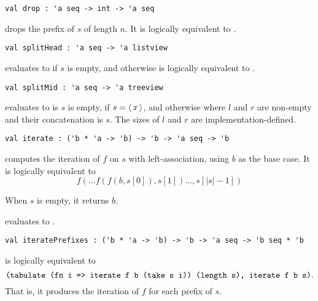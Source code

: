 \begin{gram}[drop]
\label{gr:drop}
\begin{verbatim}
val drop : 'a seq -> int -> 'a seq
\end{verbatim}
 drops the prefix of $s$ of length $n$. It is logically equivalent
to .
\end{gram}

\begin{gram}[splitHead]
\label{gr:splitHead}
\begin{verbatim}
val splitHead : 'a seq -> 'a listview
\end{verbatim}
 evaluates to  if $s$ is empty, and otherwise is
logically equivalent to .
\end{gram}

\begin{gram}[splitMid]
\label{gr:splitMid}
\begin{verbatim}
val splitMid : 'a seq -> 'a treeview
\end{verbatim}
 evaluates to  is $s$ is empty,  if
$s = \left\langle\, x \,\right\rangle$, and  otherwise where $l$ and $r$ are non-empty and their
concatenation is $s$. The sizes of $l$ and $r$ are implementation-defined.
\end{gram}

\begin{flex}
\begin{gram}[iterate]
\label{gr:iterate}
\begin{verbatim}
val iterate : ('b * 'a -> 'b) -> 'b -> 'a seq -> 'b
\end{verbatim}
 computes the iteration of $f$ on $s$ with left-association,
using $b$ as the base case. It is logically equivalent to
\[
  f(\ldots f(f(b, s[0]), s[1]) \ldots, s[|s|-1])
\]
\end{gram}
\begin{note}
When $s$ is empty, it returns $b$.
\end{note}
\begin{example}
 evaluates to .
\end{example}
\end{flex}

\begin{gram}[iteratePrefixes]
\label{gr:iteratePrefixes}
\begin{verbatim}
val iteratePrefixes : ('b * 'a -> 'b) -> 'b -> 'a seq -> 'b seq * 'b
\end{verbatim}
 is logically equivalent to
\[
  \texttt{(tabulate (fn i => iterate f b (take s i)) (length s), iterate f b s)}.
\]
That is, it produces the iteration of $f$ for each prefix of $s$.
\end{gram}

